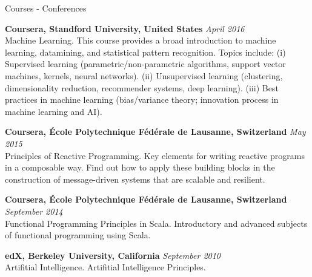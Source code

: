 \documentclass[spanish]{resume}
\begin{document}
\begin{rSection}{Courses - Conferences}

{\bf Coursera, Standford University, United States} \hfill {\em April 2016} \\
Machine Learning.
This course provides a broad introduction to machine learning, datamining, and statistical pattern recognition. Topics include: (i) Supervised learning (parametric/non-parametric algorithms, support vector machines, kernels, neural networks). (ii) Unsupervised learning (clustering, dimensionality reduction, recommender systems, deep learning). (iii) Best practices in machine learning (bias/variance theory; innovation process in machine learning and AI).

{\bf Coursera, \'Ecole Polytechnique F\'ed\'erale de Lausanne, Switzerland} \hfill {\em May 2015} \\
Principles of Reactive Programming.
Key elements for writing reactive programs in a composable way. Find out how to apply these building blocks in the construction of message-driven systems that are scalable and resilient.

{\bf Coursera, \'Ecole Polytechnique F\'ed\'erale de Lausanne, Switzerland} \hfill {\em September 2014} \\
Functional Programming Principles in Scala.
Introductory and advanced subjects of functional programming using Scala.

{\bf edX, Berkeley University, California} \hfill {\em September 2010} \\
Artifitial Intelligence.
Artifitial Intelligence Principles.

\end{rSection}
\end{document}
